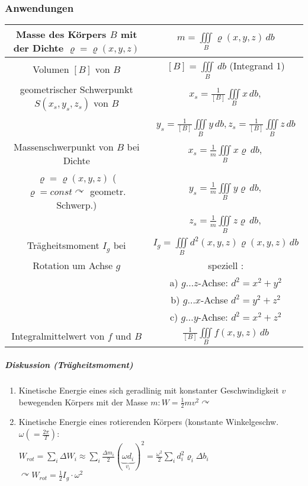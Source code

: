 \documentclass[a4paper]{scrartcl}
\begin{document}
\subsubsection{Anwendungen} 
\begin{tabular}{c|c}
Masse des Körpers $B$ mit der Dichte $\varrho = \varrho (x,y,z)$ & $m = \iiint\limits_B \varrho (x,y,z) \, db$\\ \hline
Volumen $[B]$ von $B$ & $[B] = \iiint\limits_B \, db$ (Integrand 1)\\ \hline
geometrischer Schwerpunkt $S(x_s,y_s,z_s)$ von $B$ & $x_s = \frac{1}{[B]} \iiint\limits_B x \, db,$ \\ & \\ & $ y_s = \frac{1}{[B]} \iiint\limits_B y \, db, z_s = \frac{1}{[B]} \iiint\limits_B z \, db$\\ \hline
Massenschwerpunkt von $B$ bei Dichte & $x_s = \frac{1}{m} \iiint\limits_B x \varrho \, db,$ \\ $\varrho = \varrho (x,y,z)$ ($\varrho = const \curvearrowright$ geometr. Schwerp.)  & $y_s = \frac{1}{m} \iiint\limits_B y \varrho \, db,$ \\ & $z_s = \frac{1}{m} \iiint\limits_B z \varrho \, db,$ \\ \hline
Trägheitsmoment $I_g$ bei & $I_g = \iiint\limits_B d^2 (x,y,z) \varrho (x,y,z) \, db$ \\
Rotation um Achse $g$ & speziell :\\
& a) $g \dots z$-Achse: $ d^2 = x^2 + y^2$\\
& b) $g \dots x$-Achse $d^2 = y^2 + z^2 $\\
& c) $g \dots y$-Achse: $d^2 = x^2 + z^2$\\ \hline
Integralmittelwert von $f$ und $B$ & $\frac{1}{[B]} \iiint\limits_B f(x,y,z) \, db$\\
\end{tabular}
\subparagraph{Diskussion (Trägheitsmoment)}
\begin{enumerate}
\item Kinetische Energie eines sich geradlinig mit konstanter Geschwindigkeit $v$ bewegenden Körpers mit der Masse $m: W= \frac{1}{2} m v^2 \curvearrowright$
\item Kinetische Energie eines rotierenden Körpers (konstante Winkelgeschw. $\omega (=\frac{2\pi}{T})$:\\
$W_{rot} = \sum\limits_i \Delta W_i \approx \sum\limits_i \frac{\Delta m_i}{2} (\underbrace{\omega d_i}_{v_i} ) ^2  = \frac{\omega^2}{2} \sum\limits_i d_i^2 \varrho_i \Delta b_i $ \\
$\curvearrowright W_{rot} = \frac{1}{2} I_g \cdot \omega^2$
\end{enumerate}
\end{document}
